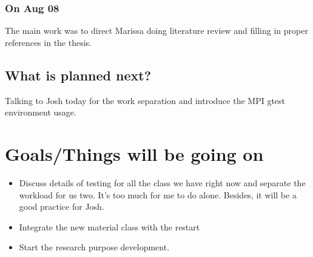 \documentclass{article}
\begin{document}
\subsubsection{On Aug 08}
The main work was to direct Marissa doing literature review and filling in proper references in the thesis.

\subsection{What is planned next?}
Talking to Josh today for the work separation and introduce the MPI gtest environment usage.



\section{Goals/Things will be going on}
\begin{itemize}
	\item Discuss details of testing for all the class we have right now and separate the workload for us two. It's too much for me to do alone. Besides, it will be a good practice for Josh.
	\item Integrate the new material class with the restart
	\item Start the research purpose development.
\end{itemize}




%
%
%

\end{document}
